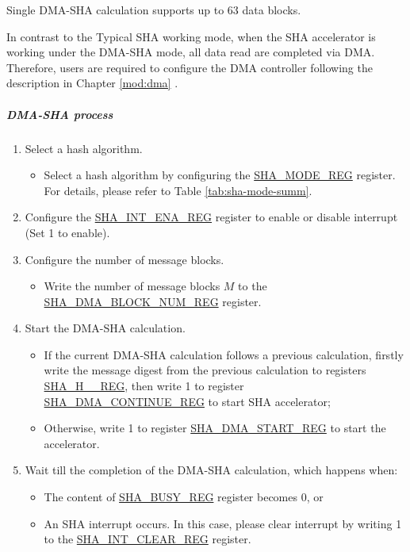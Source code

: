 \documentclass[main\_\_EN.tex]{subfiles}
\begin{document}
Single DMA-SHA calculation supports up to 63 data blocks.

In contrast to the Typical SHA working mode, when the SHA accelerator is working under the DMA-SHA mode, all data read are completed via DMA. Therefore, users are required to configure the DMA controller following the description in Chapter \ref{mod:dma} \textit{}.

\subparagraph{DMA-SHA process}

\begin{enumerate}
    \item Select a hash algorithm.
    \begin{itemize}
        \item Select a hash algorithm by configuring the \hyperref[regdesc:SHAMODEREG]{SHA\_MODE\_REG} register. For details, please refer to Table \ref{tab:sha-mode-summ}.
    \end{itemize}
    \item Configure the \hyperref[regdesc:SHAINTENAREG]{SHA\_INT\_ENA\_REG} register to enable or disable interrupt (Set 1 to enable).
    \item Configure the number of message blocks.
    \begin{itemize}
        \item  Write the number of message blocks \begin{math}M\end{math} to the  \hyperref[regdesc:SHADMABLOCKNUMREG]{SHA\_DMA\_BLOCK\_NUM\_REG} register.
    \end{itemize}
    \item Start the DMA-SHA calculation.
        \begin{itemize}
            \item If the current DMA-SHA calculation follows a previous calculation, firstly write the message digest from the previous calculation to registers \hyperref[regdesc:SHAHNREG]{SHA\_H\_\_REG}, then write 1 to register \hyperref[regdesc:SHADMACONTINUEREG]{SHA\_DMA\_CONTINUE\_REG} to start SHA accelerator;
            \item Otherwise, write 1 to register \hyperref[regdesc:SHADMASTARTREG]{SHA\_DMA\_START\_REG} to start the accelerator.
        \end{itemize}
    \item Wait till the completion of the DMA-SHA calculation, which happens when:
        \begin{itemize}
            \item The content of \hyperref[regdesc:SHABUSYREG]{SHA\_BUSY\_REG} register becomes 0, or
            \item An SHA interrupt occurs. In this case, please clear interrupt by writing 1 to the \hyperref[regdesc:SHAINTCLEARREG]{SHA\_INT\_CLEAR\_REG} register.
        \end{itemize}


\end{enumerate}
\end{document}
